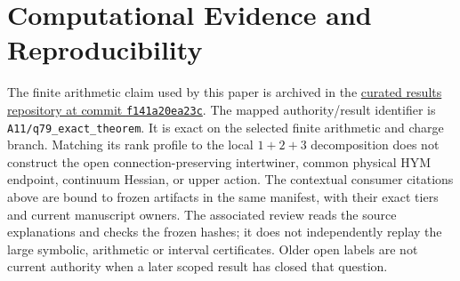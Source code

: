 \documentclass[11pt]{article}
\begin{document}
\section*{Computational Evidence and Reproducibility}
The finite arithmetic claim used by this paper is archived in the
\href{https://github.com/PeterNero/mtt-results-repro/tree/f141a20ea23c5c3ff19cc2161c0e226e29ade8a7}
{curated results repository at commit \texttt{f141a20ea23c}}.
The mapped authority/result identifier is
\nolinkurl{A11/q79_exact_theorem}.  It is exact on the selected finite
arithmetic and charge branch.  Matching its rank profile to the local
$1+2+3$ decomposition does not construct the open connection-preserving
intertwiner, common physical HYM endpoint, continuum Hessian, or upper action.
The contextual consumer citations above are bound to frozen artifacts in
the same manifest, with their exact tiers and current manuscript owners.
The associated review reads the source explanations and checks the frozen
hashes; it does not independently replay the large symbolic, arithmetic or
interval certificates. Older open labels are not current authority when a
later scoped result has closed that question.
\end{document}

